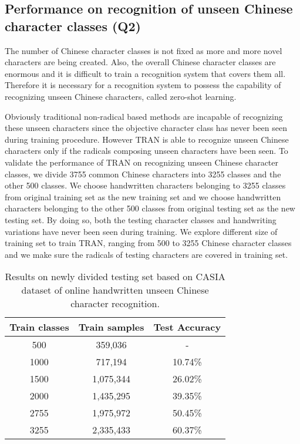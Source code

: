 \documentclass[a4paper,conference]{IEEEtran}
\begin{document}
\subsection{Performance on recognition of unseen Chinese character classes (Q2)}
\label{sec:Performance on recognition of unseen Chinese character classes (Q2)}
The number of Chinese character classes is not fixed as more and more novel characters are being created. Also, the overall Chinese character classes are enormous and it is difficult to train a recognition system that covers them all. Therefore it is necessary for a recognition system to possess the capability of recognizing unseen Chinese characters, called zero-shot learning.

Obviously traditional non-radical based methods are incapable of recognizing these unseen characters since the objective character class has never been seen during training procedure. However TRAN is able to recognize unseen Chinese characters only if the radicals composing unseen characters have been seen. To validate the performance of TRAN on recognizing unseen Chinese character classes, we divide 3755 common Chinese characters into 3255 classes and the other 500 classes. We choose handwritten characters belonging to 3255 classes from original training set as the new training set and we choose handwritten characters belonging to the other 500 classes from original testing set as the new testing set. By doing so, both the testing character classes and handwriting variations have never been seen during training. We explore different size of training set to train TRAN, ranging from 500 to 3255 Chinese character classes and we make sure the radicals of testing characters are covered in training set.
\begin{table}[h]
\caption{\label{tab:2}{Results on newly divided testing set based on CASIA dataset of online handwritten unseen Chinese character recognition.}}
\centering
\begin{tabular}{c c c}
\toprule
\textbf{Train classes} & \textbf{Train samples} & \textbf{Test Accuracy}\\
\midrule
500 & 359,036 & -\\
1000 & 717,194 & 10.74\%\\
1500 & 1,075,344 & 26.02\%\\
2000 & 1,435,295 & 39.35\%\\
2755 & 1,975,972 & 50.45\%\\
3255 & 2,335,433 & 60.37\%\\
\bottomrule
\end{tabular}
\end{table}
\end{document}
